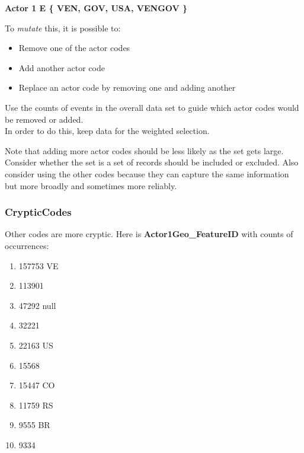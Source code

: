 \textbf{Actor 1 {\scriptsize E} {\large \{ VEN, GOV, USA, VENGOV \}}}  

To \emph{mutate} this, it is possible to:
\begin{itemize}
\item Remove one of the actor codes
\item Add another actor code
\item Replace an actor code by removing one and adding another 
\end{itemize}

\par Use the counts of events in the overall data set to guide which actor codes would be removed or added. 
\\ In order to do this, keep data for the weighted selection. %
\par Note that adding more actor codes should be less likely as the set gets large.
Consider whether the set is a set of records should be included or excluded. %
Also consider using the other codes %
 because they can capture the same information but more broadly and sometimes more reliably.
 
 \subsubsection{CrypticCodes}%
 Other codes are more cryptic. Here is \textbf{Actor1Geo\_FeatureID} with counts of occurrences:
\begin{enumerate}
\item 157753 \quad VE
\item 113901 
\item  47292 \quad null
\item  32221 
\item  22163 \quad US
\item  15568 
\item  15447 \quad CO
\item  11759 \quad RS
\item  9555 \quad BR
\item  9334  \end{enumerate}

